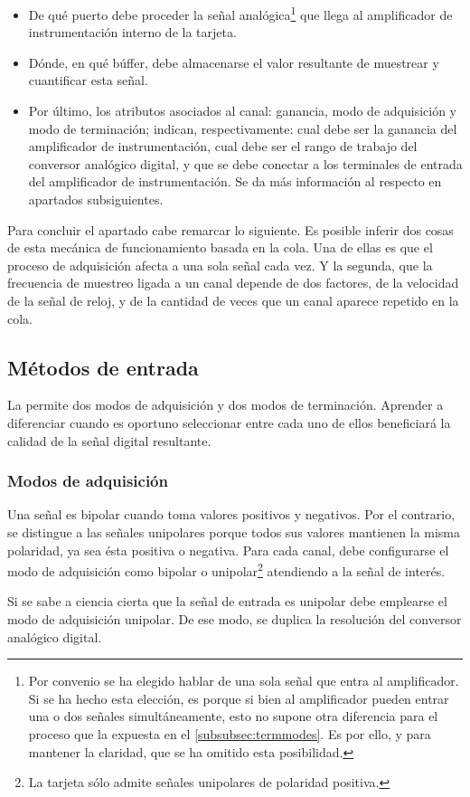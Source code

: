 \begin{itemize}
	\item De qué puerto debe proceder la señal analógica\footnote{Por convenio se ha elegido hablar de una sola señal que entra al amplificador. Si se ha hecho esta elección, es porque si bien al amplificador pueden entrar una o dos señales simultáneamente, esto no supone otra diferencia para el proceso que la expuesta en el \vref{subsubsec:termmodes}. Es por ello, y para mantener la claridad, que se ha omitido esta posibilidad.} que llega al amplificador de instrumentación interno de la tarjeta.
	\item Dónde, en qué búffer, debe almacenarse el valor resultante de muestrear y cuantificar esta señal.
	\item Por último, los atributos asociados al canal: ganancia, modo de adquisición y modo de terminación; indican, respectivamente: cual debe ser la ganancia del amplificador de instrumentación, cual debe ser el rango de trabajo del conversor analógico digital, y que se debe conectar a los terminales de entrada del amplificador de instrumentación. Se da más información al respecto en apartados subsiguientes.%
\end{itemize}

Para concluir el apartado cabe remarcar lo siguiente. Es posible inferir dos cosas de esta mecánica de funcionamiento basada en la cola. Una de ellas es que el proceso de adquisición afecta a una sola señal cada vez. Y la segunda, que la frecuencia de muestreo ligada a un canal depende de dos factores, de la velocidad de la señal de reloj, y de la cantidad de veces que un canal aparece repetido en la cola.


\subsection{Métodos de entrada}

La \kpci{} permite dos modos de adquisición y dos modos de terminación. Aprender a diferenciar cuando es oportuno seleccionar entre cada uno de ellos beneficiará la calidad de la señal digital resultante.


\subsubsection{Modos de adquisición}
Una señal es bipolar cuando toma valores positivos y negativos. Por el contrario, se distingue a las señales unipolares porque todos sus valores mantienen la misma polaridad, ya sea ésta positiva o negativa. Para cada canal, debe configurarse el modo de adquisición como bipolar o unipolar\footnote{La tarjeta \kpci{} sólo admite señales unipolares de polaridad positiva.} atendiendo a la señal de interés.\par
Si se sabe a ciencia cierta que la señal de entrada es unipolar debe emplearse el modo de adquisición unipolar. De ese modo, se duplica la resolución del conversor analógico digital.

